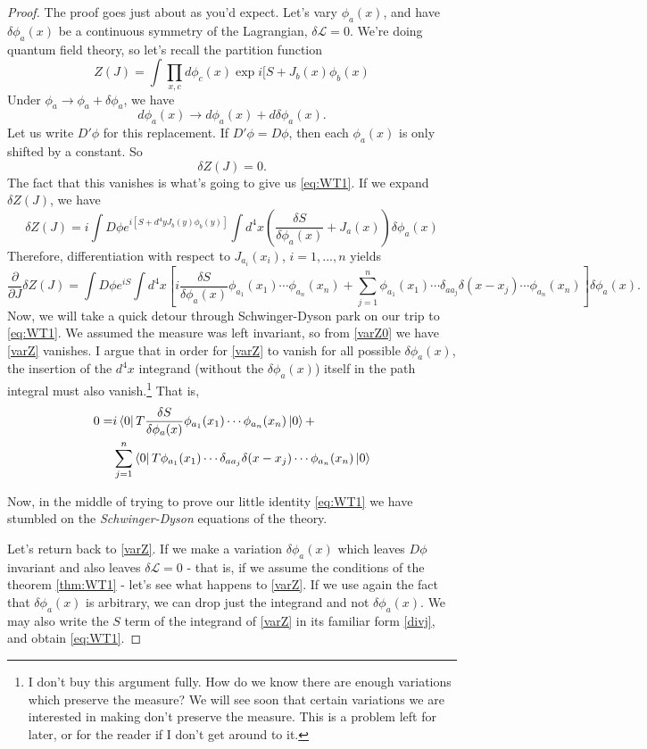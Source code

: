 \documentclass[main.tex]{subfiles}
\begin{document}
\begin{proof}
The proof goes just about as you'd expect. Let's vary $\phi_a (x)$, and have $\delta \phi_a (x)$ be a continuous symmetry of the Lagrangian, $\delta \mathcal{L} = 0$. We're doing quantum field theory, so let's recall the partition function
\[
Z(J) = \int \prod_{x,c} d \phi_c (x) \exp{i[S + J_b(x) \phi_b(x)}
\]
Under $\phi_a \to \phi_a + \delta \phi_a$, we have
\[
d \phi_a (x) \to d\phi_a (x) + d \delta \phi_a (x).
\]
Let us write $D'\phi$ for this replacement. If $D'\phi = D\phi$, then each $\phi_a (x)$ is only shifted by a constant. So
\begin{equation} \label{varZ0}
\delta Z (J) = 0.
\end{equation} 
The fact that this vanishes is what's going to give us \ref{eq:WT1}. If we expand $\delta Z(J)$, we have
\[
\delta Z(J) = i \int D \phi e^{i [S + d^4 y J_b (y) \phi_b (y)]} \int d^4 x \left(
\frac{\delta S}{\delta \phi_a (x)} + J_a (x)
\right) \delta \phi_a (x)
\]
Therefore, differentiation with respect to $J_{a_i} (x_i)$, $i=1,...,n$ yields
\begin{equation} \label{varZ}
\frac{\partial}{\partial J} \delta Z(J) = \int D \phi e^{iS} \int d^4 x \left[
i \frac{\delta S}{\delta \phi_a (x)} \phi_{a_1} (x_1) \cdots \phi_{a_n} (x_n) + \sum_{j=1}^n \phi_{a_1} (x_1) \cdots \delta_{aa_j} \delta (x-x_j) \cdots \phi_{a_n} (x_n)
\right] \delta \phi_a (x).
\end{equation}
Now, we will take a quick detour through Schwinger-Dyson park on our trip to \ref{eq:WT1}. We assumed the measure was left invariant, so from \ref{varZ0} we have \ref{varZ} vanishes. I argue that in order for \ref{varZ} to vanish for all possible $\delta \phi_a (x)$, the insertion of the $d^4 x$ integrand  (without the $\delta \phi_a (x)$) itself in the path integral must also vanish.\footnote{I don't buy this argument fully. How do we know there are enough variations which preserve the measure? We will see soon that certain variations we are interested in making don't preserve the measure. This is a problem left for later, or for the reader if I don't get around to it.} That is,
\begin{align} \label{sdequation}
0 = & i \bra{0} T \frac{\delta S}{\delta \phi_a (x)} \phi_{a_1} (x_1) \cdots \phi_{a_n} (x_n) \ket{0} + \\ & \sum_{j=1}^n \bra{0} T \phi_{a_1} (x_1) \cdots \delta_{a a_j} \delta (x - x_j) \cdots \phi_{a_n} (x_n) \ket{0}
\end{align}

Now, in the middle of trying to prove our little identity \ref{eq:WT1} we have stumbled on the \textit{Schwinger-Dyson} equations of the theory.

Let's return back to \ref{varZ}. If we make a variation $\delta \phi_a (x)$ which leaves $D \phi$ invariant and also leaves $\delta \mathcal{L} = 0$ - that is, if we assume the conditions of the theorem \ref{thm:WT1} - let's see what happens to \ref{varZ}. If we use again the fact that $\delta \phi_a (x)$ is arbitrary, we can drop just the integrand and not $\delta \phi_a (x)$. We may also write the $S$ term of the integrand of \ref{varZ} in its familiar form \ref{divj}, and obtain \ref{eq:WT1}.
\end{proof}
\end{document}

